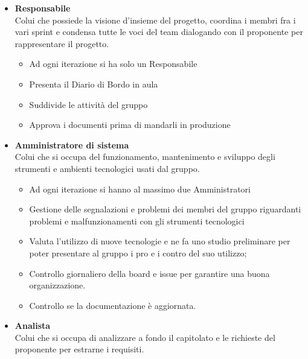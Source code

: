            \begin{itemize}
                \item \textbf{Responsabile}\\
                Colui che possiede la visione d'insieme del progetto, coordina i membri fra i vari sprint e condensa tutte le voci del team
                dialogando con il proponente per rappresentare il progetto.\\
                    \begin{itemize}
                        \item Ad ogni iterazione si ha solo un Responsabile
                        \item Presenta il Diario di Bordo in aula
                        \item Suddivide le attività del gruppo
                        \item Approva i documenti prima di mandarli in produzione
                    \end{itemize}
                \item \textbf{Amministratore di sistema}\\
                Colui che si occupa del funzionamento, mantenimento e sviluppo degli strumenti e ambienti tecnologici
                usati dal gruppo.
                    \begin{itemize}
                        \item Ad ogni iterazione si hanno al massimo due Amministratori
                        \item Gestione delle segnalazioni e problemi dei membri del gruppo riguardanti problemi e malfunzionamenti
                        con gli strumenti tecnologici
                        \item Valuta l'utilizzo di nuove tecnologie e ne fa uno studio preliminare per poter presentare al
                        gruppo i pro e i contro del suo utilizzo;
                        \item Controllo giornaliero della board e issue per garantire una buona organizzazione.
                        \item Controllo se la documentazione è aggiornata.
                    \end{itemize}
                \item \textbf{Analista}\\
                Colui che si occupa di analizzare a fondo il capitolato e le richieste del proponente per estrarne i requisiti.
                    \begin{itemize}

\end{itemize}
\end{itemize}
